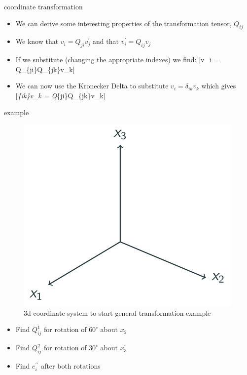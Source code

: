 \documentclass[12pt,handout]{beamer}
\providecommand{\tightlist}{%
  \setlength{\itemsep}{0pt}\setlength{\parskip}{0pt}}
\let\Oldincludegraphics\includegraphics
\renewcommand{\includegraphics}[2][]{\Oldincludegraphics[width=\textwidth,height=0.7\textheight,keepaspectratio]{#2}}
\begin{document}
\begin{frame}{coordinate transformation}
\protect\hypertarget{coordinate-transformation-4}{}
\begin{itemize}
\tightlist
\item
  We can derive some interesting properties of the transformation
  tensor, \(Q_{ij}\)
\item
  We know that \(v_i = Q_{ji}v_j^\prime\) and that
  \(v^\prime_i = Q_{ij}v_j\)
\item
  If we substitute (changing the appropriate indexes) we find: {[}v\_i =
  Q\_\{ji\}Q\_\{jk\}v\_k{]}
\item
  We can now use the Kronecker Delta to substitute
  \(v_i = \delta_{ik}v_k\) which gives {[}\delta\emph{\{ik\}v\_k =
  Q}\{ji\}Q\_\{jk\}v\_k{]}
\end{itemize}
\end{frame}

\begin{frame}{example}
\protect\hypertarget{example}{}
\begin{figure}
\centering
\includegraphics{../images/transform3d-1.svg}
\caption{3d coordinate system to start general transformation example}
\end{figure}

\begin{itemize}
\tightlist
\item
  Find \(Q_{ij}^1\) for rotation of \(60^\circ\) about \(x_2\)
\item
  Find \(Q_{ij}^2\) for rotation of \(30^\circ\) about \(x_3^\prime\)
\item
  Find \({e}_i^{\prime\prime}\) after both rotations
\end{itemize}
\end{frame}
\end{document}
